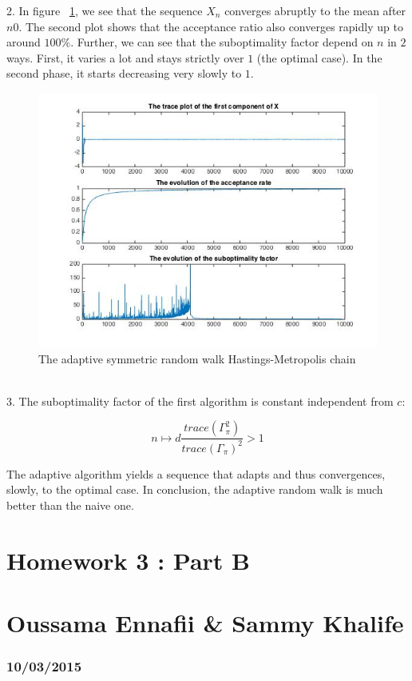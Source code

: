 	2.  In figure ~\ref{arwHM}, we see that the sequence $X_n$ converges abruptly to the mean after $n0$. The second plot shows that the acceptance ratio also converges rapidly up to around $100\%$. Further, we can see that the suboptimality factor depend on $n$ in $2$ ways. First, it varies a lot and stays strictly over $1$ (the optimal case). In the second phase, it starts decreasing very slowly to $1$.
	\begin{figure}[H]
		\centering
		\includegraphics[scale=.5]{figures/arwHM}
		\caption{The adaptive symmetric random walk Hastings-Metropolis chain}
		\label{arwHM}
	\end{figure}
	~\\
	
	3. The suboptimality factor of the first algorithm is constant independent from $c$:
	
	$$n \mapsto d\frac{trace(\Gamma_{\pi} ^2) }{trace(\Gamma_{\pi})^2}>1$$
	
	The adaptive algorithm yields a sequence that adapts and thus convergences, slowly, to the optimal case. In conclusion, the adaptive random walk is much better than the naive one.
	
	\newpage
	\section*{Homework 3 :  Part B}
	\section*{Oussama Ennafii \& Sammy Khalife}
	\subsubsection*{10/03/2015}
	

